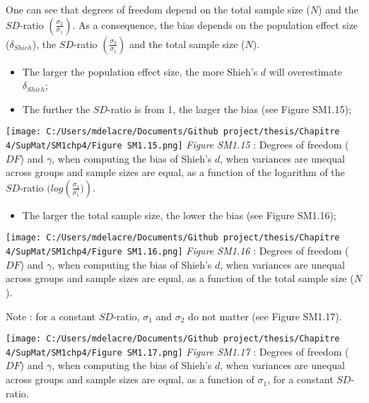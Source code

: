 \documentclass[
  english,
  man,mask,floatsintext]{apa6}
\providecommand{\tightlist}{%
  \setlength{\itemsep}{0pt}\setlength{\parskip}{0pt}}
\begin{document}
One can see that degrees of freedom depend on the total sample size (\(N\)) and the \(SD\)-ratio \(\left( \frac{\sigma_2}{\sigma_1}\right)\). As a consequence, the bias depends on the population effect size (\(\delta_{Shieh}\)), the \(SD\)-ratio \(\left( \frac{\sigma_2}{\sigma_1}\right)\) and the total sample size (\(N\)).

\begin{itemize}
\tightlist
\item
  The larger the population effect size, the more Shieh's \(d\) will overestimate \(\delta_{Shieh}\);
\end{itemize}

\newpage

\begin{itemize}
\tightlist
\item
  The further the \(SD\)-ratio is from 1, the larger the bias (see Figure SM1.15);
\end{itemize}

\texttt{[image: C:/Users/mdelacre/Documents/Github project/thesis/Chapitre 4/SupMat/SM1chp4/Figure SM1.15.png]}
\emph{Figure SM1.15} : Degrees of freedom (\(DF\)) and \(\gamma\), when computing the bias of Shieh's \(d\), when variances are unequal across groups and sample sizes are equal, as a function of the logarithm of the \(SD\)-ratio \((log \left(\frac{\sigma_2}{\sigma_1})\right)\).

\newpage

\begin{itemize}
\tightlist
\item
  The larger the total sample size, the lower the bias (see Figure SM1.16);
\end{itemize}

\texttt{[image: C:/Users/mdelacre/Documents/Github project/thesis/Chapitre 4/SupMat/SM1chp4/Figure SM1.16.png]}
\emph{Figure SM1.16} : Degrees of freedom (\(DF\)) and \(\gamma\), when computing the bias of Shieh's \(d\), when variances are unequal across groups and sample sizes are equal, as a function of the total sample size (\(N\)).

\newpage

Note : for a constant \(SD\)-ratio, \(\sigma_1\) and \(\sigma_2\) do not matter (see Figure SM1.17).

\texttt{[image: C:/Users/mdelacre/Documents/Github project/thesis/Chapitre 4/SupMat/SM1chp4/Figure SM1.17.png]}
\emph{Figure SM1.17} : Degrees of freedom (\(DF\)) and \(\gamma\), when computing the bias of Shieh's \(d\), when variances are unequal across groups and sample sizes are equal, as a function of \(\sigma_1\), for a constant \(SD\)-ratio.
\end{document}
